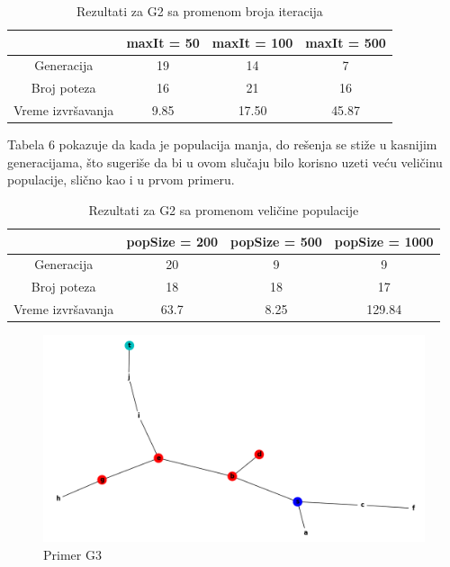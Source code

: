 \documentclass[12pt]{article}
\begin{document}
	\begin {table}[H]
\begin{center}
	\caption {Rezultati za G2 sa promenom broja iteracija} \label{tab:title} 
	\begin{tabular}{|| c|c c c||} 	
		\hline
		& maxIt = 50 & maxIt = 100 & maxIt = 500 \\ 
		\hline\hline
		Generacija & 19 & 14 & 7  \\ 
		\hline
		Broj poteza & 16 & 21 & 16\\
		\hline
		Vreme izvršavanja & 9.85 & 17.50 & 45.87 \\
		\hline
	\end{tabular}
\end{center}
\end{table}

	\par Tabela 6 pokazuje da kada je populacija manja, do rešenja se stiže u kasnijim generacijama, što sugeriše da bi u ovom slučaju bilo korisno uzeti veću veličinu populacije, slično kao i u prvom primeru. 

\begin {table}[H]
\begin{center}
\caption {Rezultati za G2 sa promenom veličine populacije} \label{tab:title} 
\begin{tabular}{|| c|c c c||} 	
	\hline
	& popSize = 200 & popSize = 500 & popSize = 1000 \\ 
	\hline\hline
	Generacija & 20 & 9 & 9 \\ 
	\hline
	Broj poteza & 18 & 18 & 17 \\
	\hline
	Vreme izvršavanja & 63.7 & 8.25 & 129.84 \\
	\hline
\end{tabular}
\end{center}
\end{table}

\begin{figure}[H]
	\begin{center}
		\includegraphics[scale=0.4]{g3.png}
	\end{center}
	\caption{Primer G3}
	\label{fig:slika4}
\end{figure}
\end{document}
